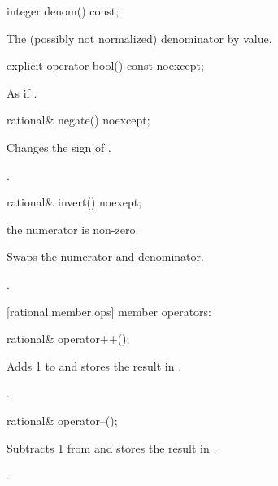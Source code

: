 \begin{itemdecl}
integer denom() const;
\end{itemdecl}

\begin{itemdescr}
\returns The (possibly not normalized) denominator by value.
\end{itemdescr}

\begin{itemdecl}
explicit operator bool() const noexcept;
\end{itemdecl}

\begin{itemdescr}
\returns As if .
\end{itemdescr}

\begin{itemdecl}
rational& negate() noexcept;
\end{itemdecl}

\begin{itemdescr}
\effects Changes the sign of .

\returns {}.
\end{itemdescr}

\begin{itemdecl}
rational& invert() noexept;
\end{itemdecl}

\begin{itemdescr}
\requires the numerator is non-zero.
    
\effects Swaps the numerator and denominator.

\returns {}.
\end{itemdescr}

[rational.member.ops]{ member operators:}

\begin{itemdecl}
rational& operator++();
\end{itemdecl}

\begin{itemdescr}
\effects Adds 1 to  and stores the result in .

\returns {}.
\end{itemdescr}

\begin{itemdecl}
rational& operator--();
\end{itemdecl}

\begin{itemdescr}
\effects Subtracts 1 from  and stores the result in .

\returns {}.
\end{itemdescr}

